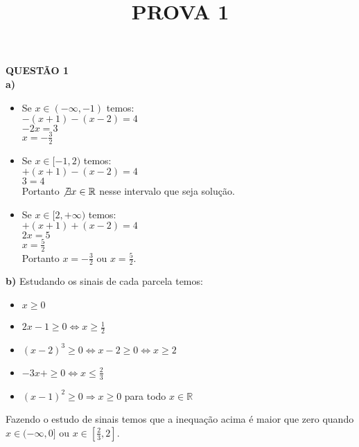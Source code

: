 \documentclass[12pt]{article}
\title{PROVA 1}
\begin{document}
 

\maketitle

{\bf QUESTÃO 1}\\

{\bf a) } 
\begin{itemize}
\item Se $x\in(-\infty,-1)$ temos:\\
$-(x+1)-(x-2)=4$\\
$-2x=3$\\
$x=- \frac{3}{2}$\\
\item Se $x\in[-1,2)$ temos:\\
$+(x+1)-(x-2)=4$\\
$3=4$\\
Portanto $\not\exists x\in \mathbb{R}$ nesse intervalo que seja solução.\\
\item Se  $x\in[2,+\infty)$ temos:\\
$+(x+1)+(x-2)=4$\\
$2x=5$\\
$x=\frac{5}{2}$\\

Portanto $x=- \frac{3}{2}$ ou $x=\frac{5}{2}$.\\
\end{itemize}

{\bf b) } 
Estudando os sinais de cada parcela temos:
\begin{itemize}
\item $x\geq0$\\
\item $2x-1\geq0 \Leftrightarrow x\geq\frac{1}{2}$\\
\item $(x-2)^3\geq0 \Leftrightarrow x-2\geq0 \Leftrightarrow x\geq2$\\
\item $-3x+\geq0 \Leftrightarrow x\leq\frac{2}{3}$\\
\item $(x-1)^2\geq0 \Rightarrow x\geq 0$ para todo $x\in\mathbb{R}$\\
\end{itemize}
Fazendo o estudo de sinais temos que a inequação acima é maior que zero quando\\ $x\in(-\infty,0]$ ou $x\in[\frac{2}{3},2]$.\\
\end{document}
